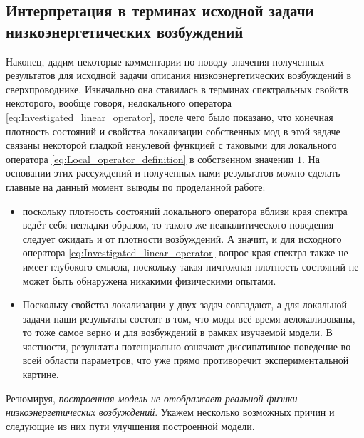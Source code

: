 \subsection{Интерпретация в терминах исходной задачи низкоэнергетических возбуждений}
Наконец, дадим некоторые комментарии по поводу значения полученных результатов для исходной задачи описания низкоэнергетических возбуждений в сверхпроводнике. Изначально она ставилась в терминах спектральных свойств некоторого, вообще говоря, нелокального оператора \eqref{eq:Investigated_linear_operator}, после чего было показано, что конечная плотность состояний и свойства локализации собственных мод в этой задаче связаны некоторой гладкой ненулевой функцией с таковыми для локального оператора \eqref{eq:Local_operator_definition} в собственном значении $1$. На основании этих рассуждений и полученных нами результатов можно сделать главные на данный момент выводы по проделанной работе: 
\begin{itemize}
	\item поскольку плотность состояний локального оператора вблизи края спектра ведёт себя негладки образом, то такого же неаналитического поведения следует ожидать и от плотности возбуждений. А значит, и для исходного оператора \eqref{eq:Investigated_linear_operator} вопрос края спектра также не имеет глубокого смысла, поскольку такая ничтожная плотность состояний не может быть обнаружена никакими физическими опытами.
	\item Поскольку свойства локализации у двух задач совпадают, а для локальной задачи наши результаты состоят в том, что моды всё время делокализованы, то тоже самое верно и для возбуждений в рамках изучаемой модели. В частности, результаты потенциально означают диссипативное поведение во всей области параметров, что уже прямо противоречит экспериментальной картине.
\end{itemize}
Резюмируя, \textit{построенная модель не отображает реальной физики низкоэнергетических возбуждений}. Укажем несколько возможных причин и следующие из них пути улучшения построенной модели.
